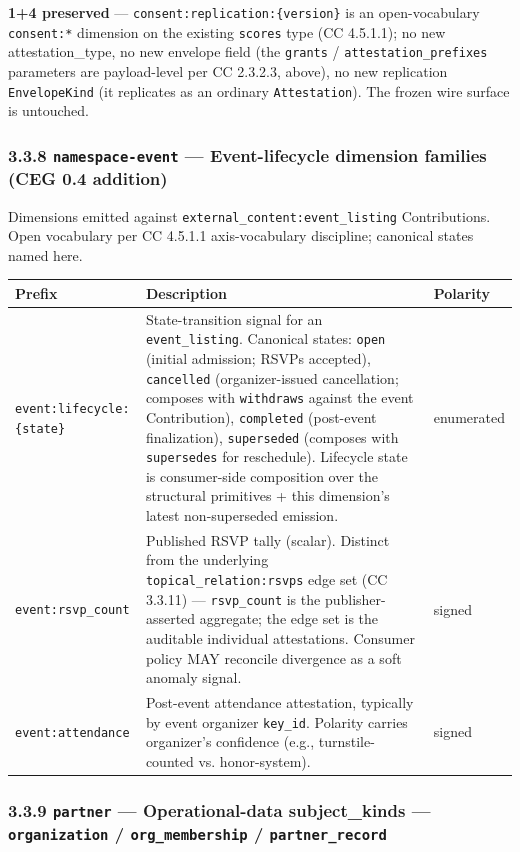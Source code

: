 \documentclass[11pt]{article}
\begin{document}
\textbf{1+4 preserved} — \texttt{consent:replication:\{version\}} is an open-vocabulary \texttt{consent:*} dimension on the existing \texttt{scores} type (CC 4.5.1.1); no new attestation\_type, no new envelope field (the \texttt{grants} / \texttt{attestation\_prefixes} parameters are payload-level per CC 2.3.2.3, above), no new replication \texttt{EnvelopeKind} (it replicates as an ordinary \texttt{Attestation}). The frozen wire surface is untouched.


\subsubsection*{3.3.8 \texttt{namespace-event} — Event-lifecycle dimension families (CEG 0.4 addition)}


Dimensions emitted against \texttt{external\_content:event\_listing} Contributions. Open vocabulary per CC 4.5.1.1 axis-vocabulary discipline; canonical states named here.


{\footnotesize
\begin{longtable}{|p{5.33cm}|p{5.33cm}|p{5.33cm}|}\hline
\textbf{Prefix} & \textbf{Description} & \textbf{Polarity} \\ \hline\endhead
\texttt{event:lifecycle:\{state\}} & State-transition signal for an \texttt{event\_listing}. Canonical states: \texttt{open} (initial admission; RSVPs accepted), \texttt{cancelled} (organizer-issued cancellation; composes with \texttt{withdraws} against the event Contribution), \texttt{completed} (post-event finalization), \texttt{superseded} (composes with \texttt{supersedes} for reschedule). Lifecycle state is consumer-side composition over the structural primitives + this dimension's latest non-superseded emission. & enumerated \\ \hline
\texttt{event:rsvp\_count} & Published RSVP tally (scalar). Distinct from the underlying \texttt{topical\_relation:rsvps} edge set (CC 3.3.11) — \texttt{rsvp\_count} is the publisher-asserted aggregate; the edge set is the auditable individual attestations. Consumer policy MAY reconcile divergence as a soft anomaly signal. & signed \\ \hline
\texttt{event:attendance} & Post-event attendance attestation, typically by event organizer \texttt{key\_id}. Polarity carries organizer's confidence (e.g., turnstile-counted vs. honor-system). & signed \\ \hline
\end{longtable}}


\subsubsection*{3.3.9 \texttt{partner} — Operational-data subject\_kinds — \texttt{organization} / \texttt{org\_membership} / \texttt{partner\_record}}
\end{document}
